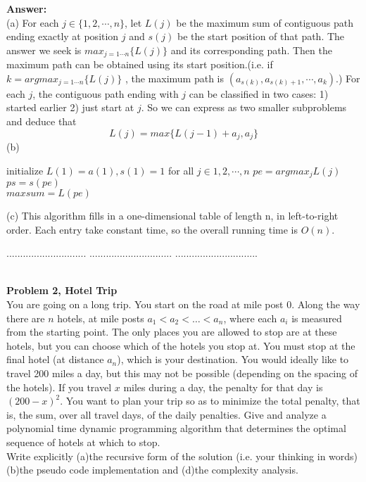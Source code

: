 \documentclass{article}
\begin{document}
\noindent
{\bf Answer:}\\

\noindent(a) For each $j\in\{1,2,\cdots,n\}$, let $L(j)$ be the maximum sum of contiguous path ending exactly at position $j$ and $s(j)$ be the start position of that path.
The answer we seek is $max_{j=1\cdots n}{\{L(j)\}}$ and its corresponding path. Then the maximum path can be obtained using its start position.(i.e. if $k=argmax_{j=1\cdots n}{\{L(j)\}}$ , the maximum path is $(a_{s(k)},a_{s(k)+1},\cdots,a_k)$.) 
For each $j$, the contiguous path ending with $j$ can be classified in two cases: 1) started earlier 2) just start at $j$. So we can express as two smaller subproblems and deduce that 
\[ 
	L(j)=max\{L(j-1)+a_j,a_j\} 
\]
\noindent(b) \\
\begin{algorithm}[H]
	initialize $L(1) = a(1), s(1)=1$ for all $j\in {1,2,\cdots,n}$\;
	$pe = argmax_j{L(j)}$\\
	$ps = s(pe)$\\
	$maxsum = L(pe)$\\
\end{algorithm} 
\noindent(c)
This algorithm fills in a one-dimensional table of length n, in left-to-right order. Each entry take constant time, so the overall running time is $O(n)$.

\pagebreak
\noindent{\bf } $.............................$
\noindent{\bf } $..............................$
\noindent{\bf } $..............................$

\noindent
{}\\

\noindent
{\bf Problem 2, Hotel Trip }\\
You are going on a long trip. You start on the road at mile post 0. Along the way there are $n$
hotels, at mile posts $a_1 < a_2 < \ldots < a_n$, where each $a_i$ is measured from the starting point.
The only places you are allowed to stop are at these hotels, but you can choose which of the hotels
you stop at. You must stop at the final hotel (at distance $a_n$), which is your destination.
You would ideally like to travel 200 miles a day, but this may not be possible (depending on the spacing
of the hotels). If you travel $x$ miles during a day, the penalty for that day is $(200 - x)^2. $ 
You want to plan your trip so as to minimize the total penalty, that is, the sum, over all travel days, 
of the daily penalties.
Give and analyze a polynomial time dynamic programming algorithm 
that determines the optimal sequence of hotels at which to stop.\\
Write explicitly (a)the recursive form of the solution (i.e. your thinking in words) (b)the pseudo code implementation and 
(d)the complexity analysis. \\
\end{document}
